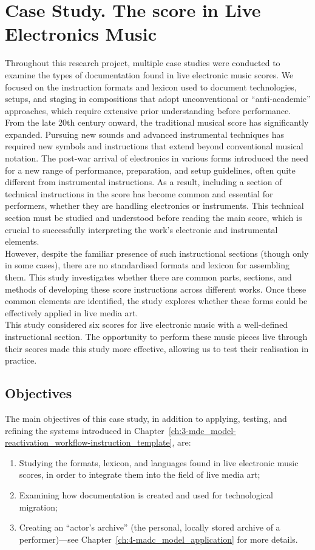 \chapter{\label{ax:c-the_score_in_live_electronics_music}Case Study. The score in Live Electronics Music}

Throughout this research project, multiple case studies were conducted to examine the types of documentation found in live electronic music scores. We focused on the instruction formats and lexicon used to document technologies, setups, and staging in compositions that adopt unconventional or ``anti-academic'' approaches, which require extensive prior understanding before performance.\\
From the late 20th century onward, the traditional musical score has significantly expanded. Pursuing new sounds and advanced instrumental techniques has required new symbols and instructions that extend beyond conventional musical notation. The post-war arrival of electronics in various forms introduced the need for a new range of performance, preparation, and setup guidelines, often quite different from instrumental instructions. As a result, including a section of technical instructions in the score has become common and essential for performers, whether they are handling electronics or instruments. This technical section must be studied and understood before reading the main score, which is crucial to successfully interpreting the work's electronic and instrumental elements.\\
However, despite the familiar presence of such instructional sections (though only in some cases), there are no standardised formats and lexicon for assembling them. This study investigates whether there are common parts, sections, and methods of developing these score instructions across different works. Once these common elements are identified, the study explores whether these forms could be effectively applied in live media art.\\
This study considered six scores for live electronic music with a well-defined instructional section. The opportunity to perform these music pieces live through their scores made this study more effective, allowing us to test their realisation in practice.

\section{Objectives}
The main objectives of this case study, in addition to applying, testing, and refining the systems introduced in Chapter~\ref{ch:3-mdc_model-reactivation_workflow-instruction_template}, are:
\begin{enumerate}
    \item Studying the formats, lexicon, and languages found in live electronic music scores, in order to integrate them into the field of live media art;
    \item Examining how documentation is created and used for technological migration;
    \item Creating an ``actor’s archive'' (the personal, locally stored archive of a performer)—see Chapter~\ref{ch:4-madc_model_application} for more details.
\end{enumerate}

